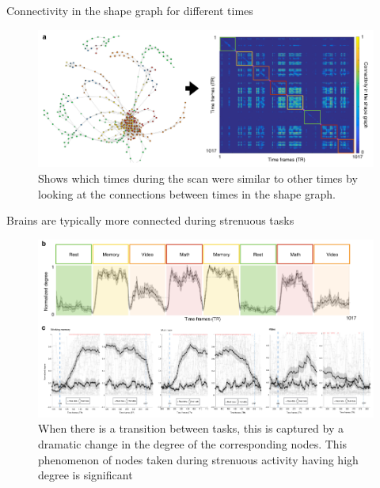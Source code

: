 \documentclass[handout]{beamer}
\begin{document}

\begin{frame}{Connectivity in the shape graph for different times}
    \begin{figure}
        \includegraphics[width = 0.95\linewidth]{fig5a.png}
        \caption{Shows which times during the scan were similar to other times by looking at the connections between times in the shape graph.}
    \end{figure}
\end{frame}

\begin{frame}{Brains are typically more connected during strenuous tasks}
    \begin{figure}
        \includegraphics[width = 0.85\linewidth]{fig5b.png}
        \caption{When there is a transition between tasks, this is captured by a dramatic change in the degree of the corresponding nodes. This phenomenon of nodes taken during strenuous activity having high degree is significant}
    \end{figure}
\end{frame}
\end{document}
